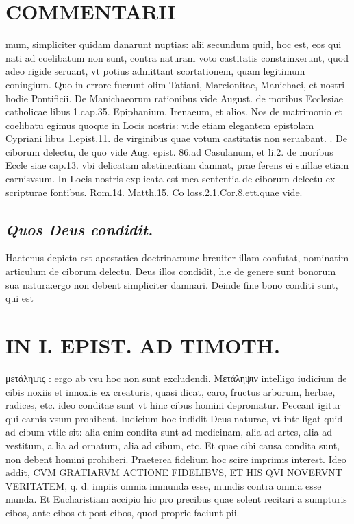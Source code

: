 \documentclass{article}
\begin{document}
\begin{pages}
\section*{COMMENTARII }
\marginpar{[ p.90 ]}\pstart mum, simpliciter quidam danarunt nuptias: alii secundum quid, hoc est, eos qui nati ad coelibatum non sunt, contra naturam voto castitatis constrinxerunt, quod adeo rigide seruant, vt potius admittant scortationem, quam legitimum coniugium. Quo in errore fuerunt olim Tatiani, Marcionitae, Manichaei, et nostri hodie Pontificii. De Manichaeorum rationibus vide August. de moribus Ecclesiae catholicae libus 1.cap.35. Epiphanium, Irenaeum, et alios. Nos de matrimonio et coelibatu egimus quoque in Locis nostris: vide etiam elegantem epistolam Cypriani libus 1.epist.11. de virginibus quae votum castitatis non seruabant.  \pend{}. De ciborum delectu, de quo vide Aug. epist. 86.ad Casulanum, et li.2. de moribus  Eccle siae cap.13. vbi delicatam abstinentiam damnat, prae ferens ei suillae etiam carnisvsum. In Locis nostris explicata est mea sententia de ciborum delectu ex scripturae fontibus. Rom.14. Matth.15. Co loss.2.1.Cor.8.ett.quae vide.  \pend
{}
{}
\subsection*{\textit{Quos Deus condidit. }}\pstart Hactenus depicta est apostatica doctrina:nunc breuiter illam confutat, nominatim articulum de ciborum delectu. Deus illos condidit, h.e de genere sunt bonorum sua natura:ergo non debent simpliciter damnari.  \pend\pstart Deinde fine bono conditi sunt, qui est  \pend
\section*{IN I. EPIST. AD TIMOTH. }
\marginpar{[ p.91 ]}\pstart μετάληψις : ergo ab vsu hoc non sunt excludendi. Μετάληψιν intelligo iudicium de cibis noxiis et innoxiis ex creaturis, quasi dicat, caro, fructus arborum, herbae, radices, etc. ideo conditae sunt vt hinc cibus homini depromatur. Peccant igitur qui carnis vsum prohibent. Iudicium hoc indidit Deus naturae, vt intelligat quid ad cibum vtile sit: alia enim condita sunt ad medicinam, alia ad artes, alia ad vestitum, a lia ad ornatum, alia ad cibum, etc. Et quae cibi causa condita sunt, non debent homini prohiberi. Praeterea fidelium hoc scire imprimis interest. Ideo addit, CVM GRATIARVM ACTIONE FIDELIBVS, ET HIS QVI NOVERVNT VERITATEM, q. d. impiis omnia immunda esse, mundis contra omnia esse munda. Et Eucharistiam accipio hic pro precibus quae solent recitari a sumpturis cibos, ante cibos et post cibos, quod proprie faciunt pii.  \pend
{}
{}

\end{pages}
\end{document}
